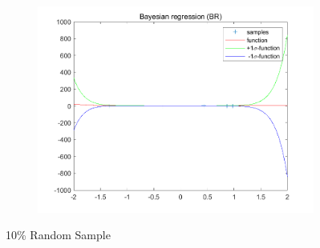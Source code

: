 \documentclass{article}
\begin{document}
\begin{figure}[H]
\begin{subfigure}[b]{0.475\textwidth}
            \includegraphics[width=\textwidth]{fig/1c-10-br.png} 
        \end{subfigure}
        \caption{10\% Random Sample}
\end{figure}
\end{document}
